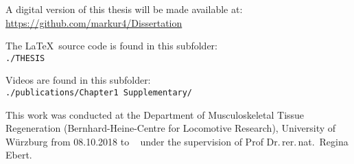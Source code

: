 


\vspace*{\fill} %

\thispagestyle{empty} %

\begin{center}
    A digital version of this thesis will be made available at:\\
    \url{https://github.com/markur4/Dissertation}

    The \LaTeX~source code is found in this subfolder:\\
    \texttt{./THESIS}

    Videos are found in this subfolder:\\
    \texttt{./publications/Chapter1 Supplementary/}

    \vspace{\vdouble}

    This work was conducted at the Department of Musculoskeletal Tissue
    Regeneration (Bernhard-Heine-Centre for Locomotive Research), University
    of Würzburg from 08.10.2018 to
    \DTMtoday~ under the supervision of Prof Dr.\,rer.\,nat.~Regina Ebert.
\end{center}





\newpage
\thispagestyle{empty} %

